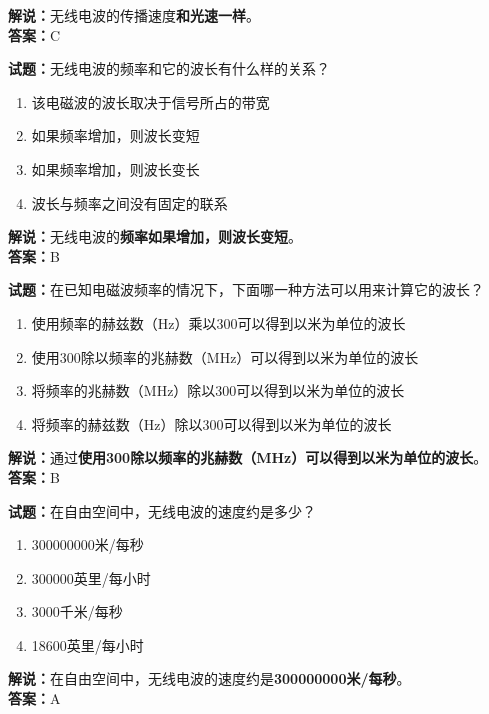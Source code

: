 \documentclass{ctexbook}
\begin{document}
\noindent\textbf{解说：}无线电波的传播速度\textbf{和光速一样}。\\\noindent\textbf{答案：}C


\bigskip


\noindent\textbf{试题：}无线电波的频率和它的波长有什么样的关系？

\begin{enumerate}[leftmargin=3em]
	\item 该电磁波的波长取决于信号所占的带宽
	\item 如果频率增加，则波长变短
	\item 如果频率增加，则波长变长
	\item 波长与频率之间没有固定的联系
\end{enumerate}

\noindent\textbf{解说：}无线电波的\textbf{频率如果增加，则波长变短}。\\\noindent\textbf{答案：}B


\bigskip


\noindent\textbf{试题：}在已知电磁波频率的情况下，下面哪一种方法可以用来计算它的波长？

\begin{enumerate}[leftmargin=3em]
	\item 使用频率的赫兹数（Hz）乘以300可以得到以米为单位的波长
	\item 使用300除以频率的兆赫数（MHz）可以得到以米为单位的波长
	\item 将频率的兆赫数（MHz）除以300可以得到以米为单位的波长
	\item 将频率的赫兹数（Hz）除以300可以得到以米为单位的波长
\end{enumerate}

\noindent\textbf{解说：}通过\textbf{使用300除以频率的兆赫数（MHz）可以得到以米为单位的波长}。\\\noindent\textbf{答案：}B


\bigskip


\noindent\textbf{试题：}在自由空间中，无线电波的速度约是多少？

\begin{enumerate}[leftmargin=3em]
	\item 300000000米/每秒
	\item 300000英里/每小时
	\item 3000千米/每秒
	\item 18600英里/每小时
\end{enumerate}

\noindent\textbf{解说：}在自由空间中，无线电波的速度约是\textbf{300000000米/每秒}。\\\noindent\textbf{答案：}A
\end{document}
